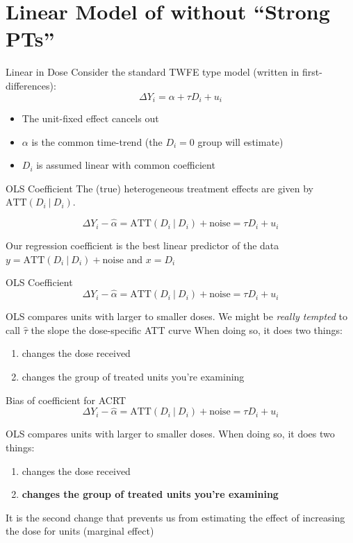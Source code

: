 \documentclass[aspectratio=169,t]{beamer}
\begin{document}
\section{Linear Model of without ``Strong PTs''}

\begin{frame}{Linear in Dose}
  Consider the standard TWFE type model (written in first-differences):
  $$
  \Delta Y_i = \alpha + \tau D_i + u_i
  $$
  \begin{itemize}
    \item The unit-fixed effect cancels out
    
    \item $\alpha$ is the common time-trend (the $D_i = 0$ group will estimate)
    
    \item $D_i$ is assumed linear with common coefficient
  \end{itemize}
\end{frame}

\begin{frame}{OLS Coefficient}
  The (true) heterogeneous treatment effects are given by $\text{ATT}(D_i \ \vert \ D_i)$.

  \bigskip
  $$
    \Delta Y_i - \hat{\alpha} = \text{ATT}(D_i \ \vert \ D_i) + \text{noise} = \tau D_i + u_i
  $$
  
  \bigskip
  Our regression coefficient is the best linear predictor of the data $y = \text{ATT}(D_i \ \vert \ D_i) + \text{noise}$ and $x = D_i$
\end{frame}

\begin{frame}{OLS Coefficient}
  $$
    \Delta Y_i - \hat{\alpha} = \text{ATT}(D_i \ \vert \ D_i) + \text{noise} = \tau D_i + u_i
  $$

  \bigskip 
  OLS compares units with larger to smaller doses. We might be \emph{really tempted} to call $\hat{\tau}$ the slope the dose-specific ATT curve
  When doing so, it does two things:
  \begin{enumerate}
    \item changes the dose received
    \item changes the group of treated units you're examining
  \end{enumerate}  
\end{frame}

\begin{frame}{Bias of coefficient for ACRT}
  $$
    \Delta Y_i - \hat{\alpha} = \text{ATT}(D_i \ \vert \ D_i) + \text{noise} = \tau D_i + u_i
  $$

  OLS compares units with larger to smaller doses. When doing so, it does two things:
  \begin{enumerate}
    \item changes the dose received
    \item \textbf{changes the group of treated units you're examining}
  \end{enumerate}

  \bigskip
  It is the second change that prevents us from estimating the effect of increasing the dose for units (marginal effect)
\end{frame}
\end{document}
